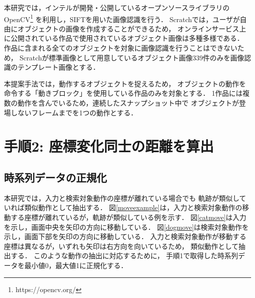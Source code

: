 \documentclass[11pt]{jreport}
\begin{document}
本研究では，インテルが開発・公開しているオープンソースライブラリのOpenCV\footnote{https://opencv.org/}
を利用し，SIFTを用いた画像認識を行う．
Scratchでは，ユーザが自由にオブジェクトの画像を作成することができるため，
オンラインサービス上に公開されている作品で使用されているオブジェクト画像は多種多様である．
作品に含まれる全てのオブジェクトを対象に画像認識を行うことはできないため，
Scratchが標準画像として用意しているオブジェクト画像339件のみを画像認識のテンプレート画像とする．

本提案手法では，動作するオブジェクトを捉えるため，
オブジェクトの動作を命令する「動きブロック」を使用している作品のみを対象とする．
1作品には複数の動作を含んでいるため，連続したスナップショット中で
オブジェクトが登場しないフレームまでを1つの動作とする．


\section{手順2: 座標変化同士の距離を算出}

\subsection{時系列データの正規化}
本研究では，入力と検索対象動作の座標が離れている場合でも
軌跡が類似していれば類似動作として抽出する．
図\ref{moveexample}は，入力と検索対象動作の移動する座標が離れているが，軌跡が類似している例を示す．
図\ref{catmove}は入力を示し，画面中央を矢印の方向に移動している．
図\ref{dogmove}は検索対象動作を示し，画面下部を矢印の方向に移動している．
入力と検索対象動作が移動する座標は異なるが，いずれも矢印は右方向を向いているため，
類似動作として抽出する．
このような動作の抽出に対応するために，
手順1で取得した時系列データを最小値0，最大値1に正規化する．
\end{document}
